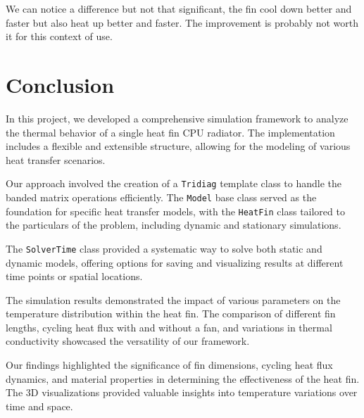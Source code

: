 \documentclass{article}
\begin{document}
We can notice a difference but not that significant, the fin cool down better and faster but also heat up better and faster. The improvement is probably not worth it for this context of use.

\section{Conclusion}

In this project, we developed a comprehensive simulation framework to analyze the thermal behavior of a single heat fin CPU radiator. The implementation includes a flexible and extensible structure, allowing for the modeling of various heat transfer scenarios.

Our approach involved the creation of a \texttt{Tridiag} template class to handle the banded matrix operations efficiently. The \texttt{Model} base class served as the foundation for specific heat transfer models, with the \texttt{HeatFin} class tailored to the particulars of the problem, including dynamic and stationary simulations.

The \texttt{SolverTime} class provided a systematic way to solve both static and dynamic models, offering options for saving and visualizing results at different time points or spatial locations.

The simulation results demonstrated the impact of various parameters on the temperature distribution within the heat fin. The comparison of different fin lengths, cycling heat flux with and without a fan, and variations in thermal conductivity showcased the versatility of our framework.

Our findings highlighted the significance of fin dimensions, cycling heat flux dynamics, and material properties in determining the effectiveness of the heat fin. The 3D visualizations provided valuable insights into temperature variations over time and space.
\end{document}
